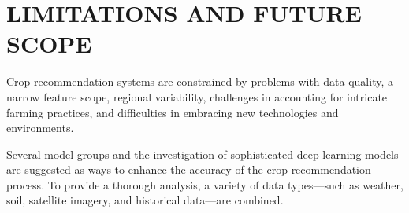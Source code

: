\section{LIMITATIONS AND FUTURE SCOPE}
Crop recommendation systems are constrained by problems with data quality, a narrow feature scope, regional variability, challenges in accounting for intricate farming practices, and difficulties in embracing new technologies and environments.

Several model groups and the investigation of sophisticated deep learning models are suggested as ways to enhance the accuracy of the crop recommendation process. To provide a thorough analysis, a variety of data types—such as weather, soil, satellite imagery, and historical data—are combined.


%




